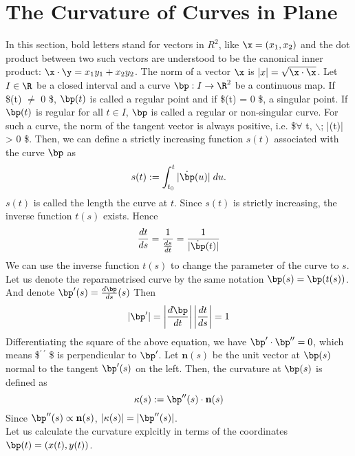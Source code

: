 \documentclass{article}
\begin{document}
\section{The Curvature of Curves in Plane}
In this section, bold letters stand for vectors in $R^2$, like $\x = (x_1, x_2)$ and the dot product between two such vectors are understood to be the canonical inner product: $\x \cdot \y = x_1 y_1 + x_2 y_2$. The norm of a vector $\x$ is $|x| = \sqrt{\x \cdot \x}$. Let $I \in \R$ be a closed interval and a curve $\bp:I \rightarrow \R^2$ be a continuous map. If \$\dot{\bp}(t) $\ne$ 0 \$, $\bp(t)$ is called a regular point and if \$\dot{\bp}(t) = 0 \$, a singular point. If $\bp(t)$ is regular for all $t \in I$, $\bp$ is called a regular or non-singular curve. For such a curve, the norm of the tangent vector is always positive, i.e. \$$\forall$ t, $\backslash$; |\dot{\bp}(t)| > 0 \$. Then, we can define a strictly increasing function $s(t)$ associated with the curve $\bp$ as
\begin{equation}
\label{}
s(t) : = \int_{t_0}^{t} |\dot{\bp}(u)| \; du.
\end{equation}
$s(t)$ is called the length the curve at $t$. Since $s(t)$ is strictly increasing, the inverse function $t(s)$ exists. Hence
\begin{equation}
\label{}
\frac{dt}{ds} = \frac{1}{\frac{ds}{dt}} = \frac{1}{|\dot{\bp}(t)|}
\end{equation}
We can use the inverse function $t(s)$ to change the parameter of the curve to $s$. Let us denote the reparametrised curve by the same notation $\bp(s) = \bp(t(s))$. And denote $\bp^{\prime}(s) = \frac{d \bp}{ds}(s)$ Then
\begin{equation}
\label{}
|\bp^{\prime}| = \left|\frac{d \bp}{dt} \right| \left|\frac{dt}{ds} \right| = 1
\end{equation}
Differentiating the square of the above equation, we have $\bp^{\prime}\cdot \bp^{\prime \prime} = 0$, which means \$\bp$^{\prime\ \prime}$ \$ is perpendicular to $\bp^{\prime}$. Let $\mathbf{n}(s)$ be the unit vector at $\bp(s)$ normal to the tangent $\bp^{\prime}(s)$ on the left. Then, the curvature at $\bp(s)$ is defined as 
\begin{equation}
\label{}
\kappa(s) := \bp^{\prime \prime}(s) \cdot \mathbf{n}(s)
\end{equation}
Since $\bp^{\prime \prime}(s) \propto \mathbf{n} (s)$, $|\kappa (s)| = |\bp^{\prime \prime}(s)|$.\\
Let us calculate the curvature explcitly in terms of the coordinates $\bp(t) =  (x(t),y(t))$.
\end{document}
